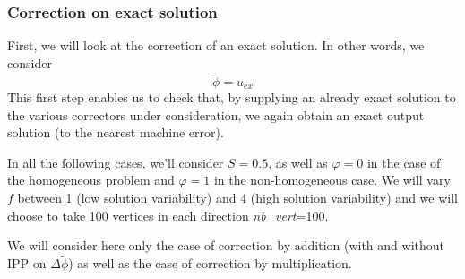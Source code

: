 \subsubsection{Correction on exact solution} \label{Corr.results.ana}
\graphicspath{{images/corr/corr_ana}}

First, we will look at the correction of an exact solution. In other words, we consider
\begin{equation*}
	\tilde{\phi}=u_{ex}
\end{equation*}
This first step enables us to check that, by supplying an already exact solution to the various correctors under consideration, we again obtain an exact output solution (to the nearest machine error).

In all the following cases, we'll consider $S=0.5$, as well as $\varphi=0$ in the case of the homogeneous problem and $\varphi=1$ in the non-homogeneous case. We will vary $f$ between 1 (low solution variability) and 4 (high solution variability) and we will choose to take 100 vertices in each direction \textit{nb\_vert}=100.

\begin{Rem}
	We will consider here only the case of correction by addition (with and without IPP on $\Delta\tilde{\phi}$) as well as the case of correction by multiplication.
\end{Rem}

